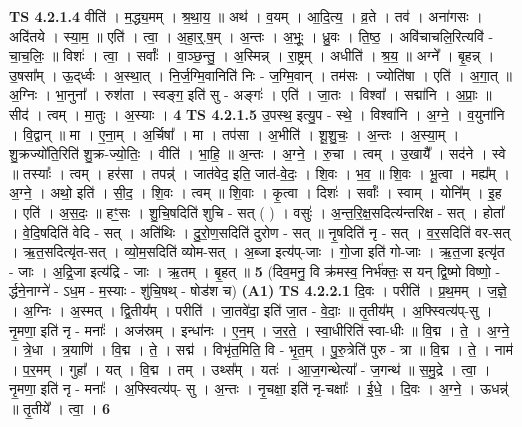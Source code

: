 \documentclass[17pt]{extarticle}
\begin{document}
                  \newline
                                \textbf{ TS 4.2.1.4} \newline
                  वीति॑ । म॒द्ध्य॒मम् । श्र॒था॒य॒ ॥ अथ॑ । व॒यम् । आ॒दि॒त्य॒ । व्र॒ते । तव॑ । अना॑गसः । अदि॑तये । स्या॒म॒ ॥ एति॑ । त्वा॒ । अ॒हा॒र्॒.ष॒म् । अ॒न्तः । अ॒भूः॒ । ध्रु॒वः । ति॒ष्ठ॒ । अवि॑चाचलि॒रित्यवि॑ - चा॒च॒लिः॒ ॥ विशः॑ । त्वा॒ । सर्वाः᳚ । वा॒ञ्छ॒न्तु॒ । अ॒स्मिन्न् । रा॒ष्ट्रम् । अधीति॑ । श्र॒य॒ ॥ अग्ने᳚ । बृ॒हन्न् । उ॒षसा᳚म् । ऊ॒द्‌र्ध्वः । अ॒स्था॒त् । नि॒र्ज॒ग्मि॒वानिति॑ निः - ज॒ग्मि॒वान् । तम॑सः । ज्योति॑षा । एति॑ । अ॒गा॒त् ॥ अ॒ग्निः । भा॒नुना᳚ । रुश॑ता । स्वङ्ग॒ इति॑ सु - अङ्गः॑ । एति॑ । जा॒तः । विश्वा᳚ । सद्मा॑नि । अ॒प्राः॒ ॥ सीद॑ । त्वम् । मा॒तुः । अ॒स्याः । \textbf{  4} \newline
                  \newline
                                \textbf{ TS 4.2.1.5} \newline
                  उ॒पस्थ॒ इत्यु॒प - स्थे॒ । विश्वा॑नि । अ॒ग्ने॒ । व॒युना॑नि । वि॒द्वान् ॥ मा । ए॒ना॒म् । अ॒र्चिषा᳚ । मा । तप॑सा । अ॒भीति॑ । शू॒शु॒चः॒ । अ॒न्तः । अ॒स्या॒म् । शु॒क्रज्यो॑ति॒रिति॑ शु॒क्र-ज्यो॒तिः॒ । वीति॑ । भा॒हि॒ ॥ अ॒न्तः । अ॒ग्ने॒ । रु॒चा । त्वम् । उ॒खायै᳚ । सद॑ने । स्वे ॥ तस्याः᳚ । त्वम् । हर॑सा । तपन्न्॑ । जात॑वेद॒ इति॒ जात॑-वे॒दः॒ । शि॒वः । भ॒व॒ ॥ शि॒वः । भू॒त्वा । मह्य᳚म् । अ॒ग्ने॒ । अथो॒ इति॑ । सी॒द॒ । शि॒वः । त्वम् ॥ शि॒वाः । कृ॒त्वा । दिशः॑ । सर्वाः᳚ । स्वाम् । योनि᳚म् । इ॒ह । एति॑ । अ॒स॒दः॒ ॥ हꣳ॒॒सः । शु॒चि॒षदिति॑ शुचि - सत् ( ) । वसुः॑ । अ॒न्त॒रि॒क्ष॒सदित्य॑न्तरिक्ष - सत् । होता᳚ । वे॒दि॒षदिति॑ वेदि - सत् । अति॑थिः । दु॒रो॒ण॒सदिति॑ दुरोण - सत् ॥ नृ॒षदिति॑ नृ - सत् । व॒र॒सदिति॑ वर-सत् । ऋ॒त॒सदित्यृ॑त-सत् । व्यो॒म॒सदिति॑ व्योम-सत् । अ॒ब्जा इत्य॑प्-जाः । गो॒जा इति॑ गो-जाः । ऋ॒त॒जा इत्यृ॑त - जाः । अ॒द्रि॒जा इत्य॑द्रि - जाः । ऋ॒तम् । बृ॒हत् ॥ \textbf{  5 } \newline
                  \newline
                      (दिव॒मनु॒ वि क्र॑मस्व॒ निर्भ॑क्तः॒ स यन् द्वि॒ष्मो विष्णो॒ - र्द्धने॒नाग्ने॑ - ऽध॒म - म॒स्याः - शु॑चि॒षथ् - षोड॑श च)  \textbf{(A1)} \newline \newline
                                \textbf{ TS 4.2.2.1} \newline
                  दि॒वः । परीति॑ । प्र॒थ॒मम् । ज॒ज्ञे॒ । अ॒ग्निः । अ॒स्मत् । द्वि॒तीय᳚म् । परीति॑ । जा॒तवे॑दा॒ इति॑ जा॒त - वे॒दाः॒ ॥ तृ॒तीय᳚म् । अ॒फ्स्वित्य॑प्-सु । नृ॒मणा॒ इति॑ नृ - मनाः᳚ । अज॑स्रम् । इन्धा॑नः । ए॒न॒म् । ज॒र॒ते॒ । स्वा॒धीरिति॑ स्वा-धीः ॥ वि॒द्म । ते॒ । अ॒ग्ने॒ । त्रे॒धा । त्र॒याणि॑ । वि॒द्म । ते॒ । सद्म॑ । विभृ॑त॒मिति॒ वि - भृ॒त॒म् । पु॒रु॒त्रेति॑ पुरु - त्रा ॥ वि॒द्म । ते॒ । नाम॑ । प॒र॒मम् । गुहा᳚ । यत् । वि॒द्म । तम् । उथ्स᳚म् । यतः॑ । आ॒ज॒गन्थेत्या᳚ - ज॒गन्थ॑ ॥ स॒मु॒द्रे । त्वा॒ । नृ॒मणा॒ इति॑ नृ - मनाः᳚ । अ॒फ्स्वित्य॑प्- सु । अ॒न्तः । नृ॒चक्षा॒ इति॑ नृ-चक्षाः᳚ । ई॒धे॒ । दि॒वः । अ॒ग्ने॒ । ऊधन्न्॑ ॥ तृ॒तीये᳚ । त्वा॒ । \textbf{  6} \newline
\end{document}
